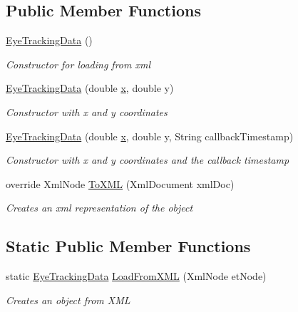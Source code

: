 \subsection*{Public Member Functions}
\begin{DoxyCompactItemize}
\item 
\hyperlink{class_web_analyzer_1_1_models_1_1_data_model_1_1_eye_tracking_data_a019976267c787cca233fa585617604a9}{Eye\+Tracking\+Data} ()
\begin{DoxyCompactList}\small\item\em Constructor for loading from xml \end{DoxyCompactList}\item 
\hyperlink{class_web_analyzer_1_1_models_1_1_data_model_1_1_eye_tracking_data_a70772188385fd52208012f521b681587}{Eye\+Tracking\+Data} (double \hyperlink{_u_i_2_h_t_m_l_resources_2js_2lib_2underscore_8min_8js_a81e910173af87b1161e719a504d52407}{x}, double y)
\begin{DoxyCompactList}\small\item\em Constructor with x and y coordinates \end{DoxyCompactList}\item 
\hyperlink{class_web_analyzer_1_1_models_1_1_data_model_1_1_eye_tracking_data_ab19e82540642c30ffdcc165b614f1484}{Eye\+Tracking\+Data} (double \hyperlink{_u_i_2_h_t_m_l_resources_2js_2lib_2underscore_8min_8js_a81e910173af87b1161e719a504d52407}{x}, double y, String callback\+Timestamp)
\begin{DoxyCompactList}\small\item\em Constructor with x and y coordinates and the callback timestamp \end{DoxyCompactList}\item 
override Xml\+Node \hyperlink{class_web_analyzer_1_1_models_1_1_data_model_1_1_eye_tracking_data_a1c9442c2b205d50095519102069ad2cd}{To\+X\+M\+L} (Xml\+Document xml\+Doc)
\begin{DoxyCompactList}\small\item\em Creates an xml representation of the object \end{DoxyCompactList}\end{DoxyCompactItemize}
\subsection*{Static Public Member Functions}
\begin{DoxyCompactItemize}
\item 
static \hyperlink{class_web_analyzer_1_1_models_1_1_data_model_1_1_eye_tracking_data}{Eye\+Tracking\+Data} \hyperlink{class_web_analyzer_1_1_models_1_1_data_model_1_1_eye_tracking_data_a8b4193887c838834858386d84b2cbc1b}{Load\+From\+X\+M\+L} (Xml\+Node et\+Node)
\begin{DoxyCompactList}\small\item\em Creates an object from X\+M\+L \end{DoxyCompactList}\end{DoxyCompactItemize}
